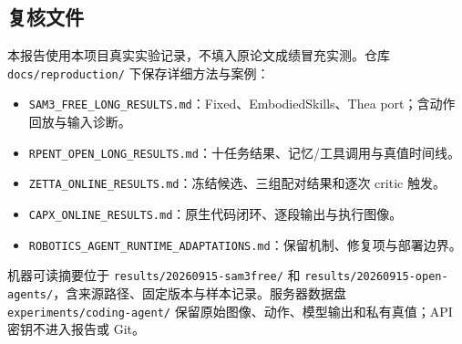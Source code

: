 \documentclass[UTF8,11pt,a4paper,fontset=none]{ctexart}
\begin{document}
\subsection*{复核文件}
本报告使用本项目真实实验记录，不填入原论文成绩冒充实测。仓库 \texttt{docs/reproduction/} 下保存详细方法与案例：
\begin{itemize}[leftmargin=1.4em,itemsep=0.25em,topsep=0.2em]
\item \texttt{SAM3\_FREE\_LONG\_RESULTS.md}：Fixed、EmbodiedSkills、Thea port；含动作回放与输入诊断。
\item \texttt{RPENT\_OPEN\_LONG\_RESULTS.md}：十任务结果、记忆/工具调用与真值时间线。
\item \texttt{ZETTA\_ONLINE\_RESULTS.md}：冻结候选、三组配对结果和逐次 critic 触发。
\item \texttt{CAPX\_ONLINE\_RESULTS.md}：原生代码闭环、逐段输出与执行图像。
\item \texttt{ROBOTICS\_AGENT\_RUNTIME\_ADAPTATIONS.md}：保留机制、修复项与部署边界。
\end{itemize}
机器可读摘要位于 \texttt{results/20260915-sam3free/} 和 \texttt{results/20260915-open-agents/}，含来源路径、固定版本与样本记录。服务器数据盘 \texttt{experiments/coding-agent/} 保留原始图像、动作、模型输出和私有真值；API 密钥不进入报告或 Git。
\end{document}
